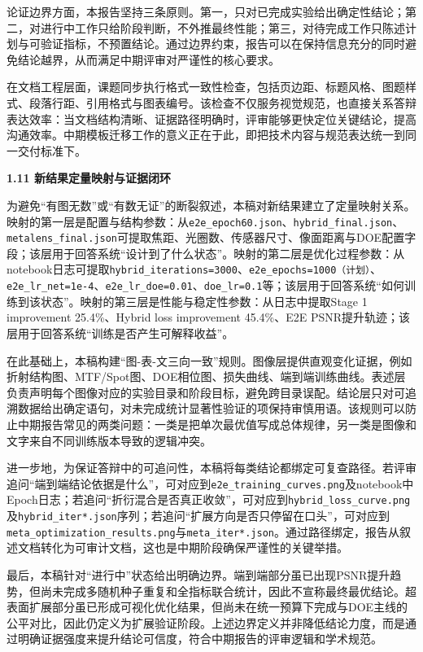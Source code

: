 \documentclass[UTF8,12pt,fontset=fandol]{ctexart}
\newcommand{\hfirst}[1]{%
\vspace{0.6em}
\noindent\textbf{#1}\par
}
\begin{document}
论证边界方面，本报告坚持三条原则。第一，只对已完成实验给出确定性结论；第二，对进行中工作只给阶段判断，不外推最终性能；第三，对待完成工作只陈述计划与可验证指标，不预置结论。通过边界约束，报告可以在保持信息充分的同时避免结论越界，从而满足中期评审对严谨性的核心要求。



在文档工程层面，课题同步执行格式一致性检查，包括页边距、标题风格、图题样式、段落行距、引用格式与图表编号。该检查不仅服务视觉规范，也直接关系答辩表达效率：当文档结构清晰、证据路径明确时，评审能够更快定位关键结论，提高沟通效率。中期模板迁移工作的意义正在于此，即把技术内容与规范表达统一到同一交付标准下。

\hfirst{1.11 新结果定量映射与证据闭环}

为避免“有图无数”或“有数无证”的断裂叙述，本稿对新结果建立了定量映射关系。映射的第一层是配置与结构参数：从\texttt{e2e\_epoch60.json}、\texttt{hybrid\_final.json}、\texttt{metalens\_final.json}可提取焦距、光圈数、传感器尺寸、像面距离与DOE配置字段；该层用于回答系统“设计到了什么状态”。映射的第二层是优化过程参数：从notebook日志可提取\texttt{hybrid\_iterations=3000}、\texttt{e2e\_epochs=1000（计划）}、\texttt{e2e\_lr\_net=1e-4}、\texttt{e2e\_lr\_doe=0.01}、\texttt{doe\_lr=0.1}等；该层用于回答系统“如何训练到该状态”。映射的第三层是性能与稳定性参数：从日志中提取Stage 1 improvement 25.4\%、Hybrid loss improvement 45.4\%、E2E PSNR提升轨迹；该层用于回答系统“训练是否产生可解释收益”。

在此基础上，本稿构建“图-表-文三向一致”规则。图像层提供直观变化证据，例如折射结构图、MTF/Spot图、DOE相位图、损失曲线、端到端训练曲线。表述层负责声明每个图像对应的实验目录和阶段目标，避免跨目录误配。结论层只对可追溯数据给出确定语句，对未完成统计显著性验证的项保持审慎用语。该规则可以防止中期报告常见的两类问题：一类是把单次最优值写成总体规律，另一类是图像和文字来自不同训练版本导致的逻辑冲突。

进一步地，为保证答辩中的可追问性，本稿将每类结论都绑定可复查路径。若评审追问“端到端结论依据是什么”，可对应到\texttt{e2e\_training\_curves.png}及notebook中Epoch日志；若追问“折衍混合是否真正收敛”，可对应到\texttt{hybrid\_loss\_curve.png}及\texttt{hybrid\_iter*.json}序列；若追问“扩展方向是否只停留在口头”，可对应到\texttt{meta\_optimization\_results.png}与\texttt{meta\_iter*.json}。通过路径绑定，报告从叙述文档转化为可审计文档，这也是中期阶段确保严谨性的关键举措。

最后，本稿针对“进行中”状态给出明确边界。端到端部分虽已出现PSNR提升趋势，但尚未完成多随机种子重复和全指标联合统计，因此不宣称最终最优结论。超表面扩展部分虽已形成可视化优化结果，但尚未在统一预算下完成与DOE主线的公平对比，因此仍定义为扩展验证阶段。上述边界定义并非降低结论力度，而是通过明确证据强度来提升结论可信度，符合中期报告的评审逻辑和学术规范。
\end{document}
